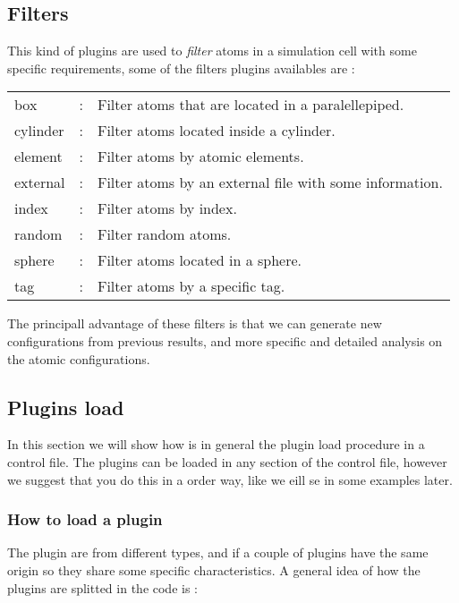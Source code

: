 \subsection{Filters}

This kind of plugins are used to \textit{filter} atoms in a simulation cell
with some specific requirements, some of the filters plugins availables are :

\vspace{1cm}
\begin{center}
\begin{tabular}{lcl}
box &:& Filter atoms that are located in a paralellepiped.\\
cylinder &:& Filter atoms located inside a cylinder.\\
element &:& Filter atoms by atomic elements.\\
external &:& Filter atoms by an external file with some information.\\
index &:& Filter atoms by index.\\
random &:& Filter random atoms.\\
sphere &:& Filter atoms located in a sphere.\\  
tag &:& Filter atoms by a specific tag.\\
\end{tabular}
\end{center}
\vspace{1cm}

The principall advantage of these filters is that we can generate new
configurations from previous results, and more specific and detailed analysis
on the atomic configurations.

\subsection{Plugins load}

In this section we will show how is in general the plugin load procedure in a
control file. The plugins can be loaded in any section of the control file,
however we suggest that you do this in a order way, like we eill se in some
examples later.

\subsubsection{How to load a plugin}

The plugin are from different types, and if a couple of plugins have the same
origin so they share some specific characteristics. A general idea of how the
plugins are splitted in the code is :

